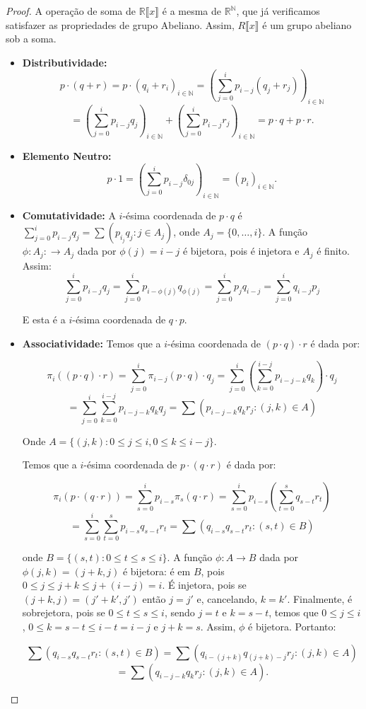 \begin{proof}
    A operação de soma de $\mathbb R\llbracket x \rrbracket$ é a mesma de $\mathbb R^{\mathbb N}$, que já verificamos satisfazer as propriedades de grupo Abeliano. Assim, $R\llbracket x \rrbracket$ é um grupo abeliano sob a soma.
    \begin{itemize}
        \item \textbf{Distributividade:} $$p\cdot (q+r)=p\cdot(q_i+r_i)_{i \in \mathbb N}=\left(\sum_{j=0}^i p_{i-j}(q_j+r_j)\right)_{i \in \mathbb N}$$$$=\left(\sum_{j=0}^i p_{i-j}q_j\right)_{i \in \mathbb N}+\left(\sum_{j=0}^i p_{i-j}r_j\right)_{i \in \mathbb N}=p\cdot q+p\cdot r.$$
        \item \textbf{Elemento Neutro:} $$p\cdot 1=\left(\sum_{j=0}^i p_{i-j}\delta_{0j}\right)_{i\in \mathbb N}=(p_i)_{i \in \mathbb N}.$$
        \item \textbf{Comutatividade:} A $i$-ésima coordenada de $p\cdot q$ é $\sum_{j=0}^i p_{i-j}q_j=\sum(p_{i_j}q_j: j \in A_j)$, onde $A_j=\{0, \dots, i\}$. A função $\phi: A_j:\rightarrow A_j$ dada por $\phi(j)=i-j$ é bijetora, pois é injetora e $A_j$ é finito. Assim:
        $$\sum_{j=0}^i p_{i-j}q_j=\sum_{j=0}^ip_{i-\phi(j)}q_{\phi(j)}=\sum_{j=0}^ip_{j}q_{i-j}=\sum_{j=0}^iq_{i-j}p_{j}$$

        E esta é a $i$-ésima coordenada de $q\cdot p$.

        \item \textbf{Associatividade:} Temos que a $i$-ésima coordenada de $(p\cdot q)\cdot r$ é dada por:

        $$\pi_i((p\cdot q)\cdot r)=\sum_{j=0}^i\pi_{i-j}(p\cdot q)\cdot q_j=\sum_{j=0}^i\left(\sum_{k=0}^{i-j}p_{i-j-k}q_k\right)\cdot q_j$$
        $$=\sum_{j=0}^{i}\sum_{k=0}^{i-j}p_{i-j-k}q_kq_j=\sum\left(p_{i-j-k}q_kr_j:(j, k)\in A\right)$$

        Onde $A=\{(j, k): 0\leq j\leq i, 0\leq k\leq i-j\}$.

        Temos que a $i$-ésima coordenada de $p\cdot (q\cdot r)$ é dada por:

        $$\pi_i(p\cdot (q\cdot r))=\sum_{s=0}^ip_{i-s}\pi_s(q\cdot r)=\sum_{s=0}^ip_{i-s}\left(\sum_{t=0}^sq_{s-t}r_t\right)$$
        $$=\sum_{s=0}^i\sum_{t=0}^sp_{i-s}q_{s-t}r_t=\sum\left(q_{i-s}q_{s-t}r_t:(s, t)\in B\right)$$
        
        onde $B=\{(s, t): 0\leq t\leq s\leq i\}$. A função $\phi: A\rightarrow B$ dada por $\phi(j, k)=(j+k, j)$ é bijetora: é em $B$, pois $0\leq j\leq j+k\leq j+(i-j)=i$. É injetora, pois se $(j+k, j)=(j'+k', j')$ então $j=j'$ e, cancelando, $k=k'$. Finalmente, é sobrejetora, pois se $0\leq t\leq s\leq i$, sendo $j=t$ e $k=s-t$, temos que $0\leq j\leq i$, $0\leq k=s-t\leq i-t=i-j$ e $j+k=s$. Assim, $\phi$ é bijetora. Portanto:

        $$\sum\left(q_{i-s}q_{s-t}r_t:(s, t)\in B\right)=\sum\left(q_{i-(j+k)}q_{(j+k)-j}r_j:(j, k)\in A\right)$$$$=\sum\left(q_{i-j-k}q_{k}r_j:(j, k)\in A\right).$$
    \end{itemize}
\end{proof}


